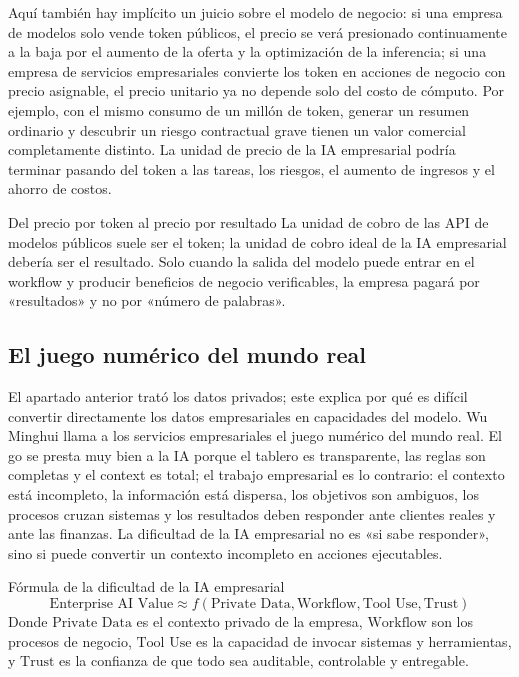 Aquí también hay implícito un juicio sobre el modelo de negocio: si una empresa de modelos solo vende token públicos, el precio se verá presionado continuamente a la baja por el aumento de la oferta y la optimización de la inferencia; si una empresa de servicios empresariales convierte los token en acciones de negocio con precio asignable, el precio unitario ya no depende solo del costo de cómputo. Por ejemplo, con el mismo consumo de un millón de token, generar un resumen ordinario y descubrir un riesgo contractual grave tienen un valor comercial completamente distinto. La unidad de precio de la IA empresarial podría terminar pasando del token a las tareas, los riesgos, el aumento de ingresos y el ahorro de costos.

\begin{importantbox}{Del precio por token al precio por resultado}
La unidad de cobro de las API de modelos públicos suele ser el token; la unidad de cobro ideal de la IA empresarial debería ser el resultado. Solo cuando la salida del modelo puede entrar en el workflow y producir beneficios de negocio verificables, la empresa pagará por «resultados» y no por «número de palabras».
\end{importantbox}

\subsection{El juego numérico del mundo real}

El apartado anterior trató los datos privados; este explica por qué es difícil convertir directamente los datos empresariales en capacidades del modelo. Wu Minghui llama a los servicios empresariales el juego numérico del mundo real. El go se presta muy bien a la IA porque el tablero es transparente, las reglas son completas y el context es total; el trabajo empresarial es lo contrario: el contexto está incompleto, la información está dispersa, los objetivos son ambiguos, los procesos cruzan sistemas y los resultados deben responder ante clientes reales y ante las finanzas. La dificultad de la IA empresarial no es «si sabe responder», sino si puede convertir un contexto incompleto en acciones ejecutables.

\begin{importantbox}{Fórmula de la dificultad de la IA empresarial}
\[
\text{Enterprise AI Value} \approx f(\text{Private Data}, \text{Workflow}, \text{Tool Use}, \text{Trust})
\]
Donde \(\text{Private Data}\) es el contexto privado de la empresa, \(\text{Workflow}\) son los procesos de negocio, \(\text{Tool Use}\) es la capacidad de invocar sistemas y herramientas, y \(\text{Trust}\) es la confianza de que todo sea auditable, controlable y entregable.
\end{importantbox}

